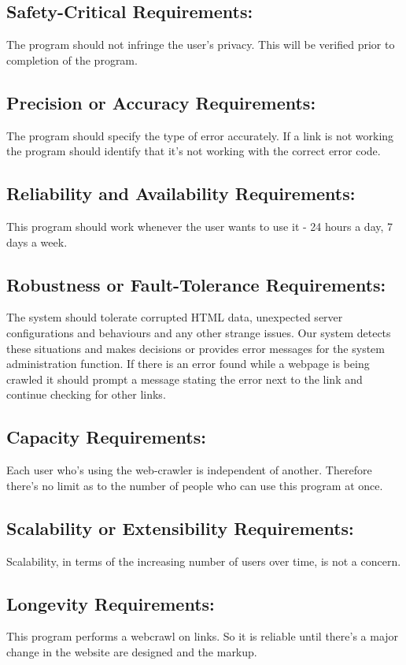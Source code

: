 \documentclass[titlepage]{article}
\begin{document}
\subsection*{Safety-Critical Requirements: }The program should not infringe the user's privacy. 
This will be verified prior to completion of the program.

\subsection*{Precision or Accuracy Requirements:}
The program should specify the type of error accurately. If a link is not working the program should identify that it's not working with the correct error code.

\subsection*{Reliability and Availability Requirements:}

This program should work whenever the user wants to use it - 24 hours a day, 7 days a week.

\subsection*{Robustness or Fault-Tolerance Requirements:}
The system should tolerate corrupted HTML data, unexpected server configurations and behaviours and any other strange issues. Our system detects these situations and makes decisions or provides error messages for the system administration function.
If there is an error found while a webpage is being crawled it should prompt a message stating the error next to the link and continue checking for other links.

\subsection*{Capacity Requirements:}
Each user who's using the web-crawler is independent of another. Therefore there's no limit as to the number of people who can use this program at once.

\subsection*{Scalability or Extensibility Requirements:}
Scalability, in terms of the increasing number of users over time, is not a concern.

\subsection*{Longevity Requirements:}
This program performs a webcrawl on links. So it is reliable until there's a major change in the website are designed and the markup.
\end{document}
